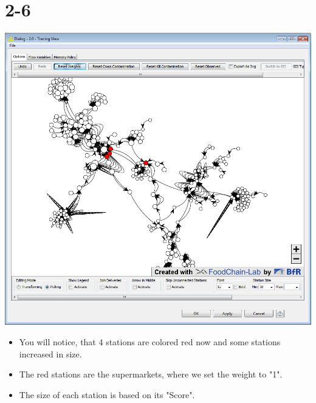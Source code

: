 \documentclass{beamer}
\begin{document}
\section{2-6}
\begin{frame}
	\begin{center}
  		\includegraphics[height=0.6\textheight]{2-6.png}
	\end{center}
	\begin{itemize}
		\item You will notice, that 4 stations are colored red now and some stations increased in size.
		\item The red stations are the supermarkets, where we set the weight to "1".
		\item The size of each station is based on its "Score".
	\end{itemize}
\end{frame}
\end{document}
